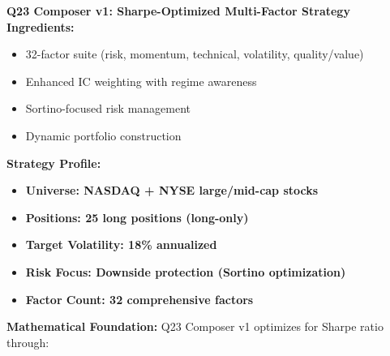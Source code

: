 \documentclass[11pt,letterpaper,openany]{book}
\begin{document}
\textbf{Q23 Composer v1: Sharpe-Optimized Multi-Factor Strategy}
\textbf{Ingredients:}
\begin{itemize}
    \item 32-factor suite (risk, momentum, technical, volatility, quality/value)
    \item Enhanced IC weighting with regime awareness
    \item Sortino-focused risk management
    \item Dynamic portfolio construction
\end{itemize}
\textbf{Strategy Profile:}
\begin{itemize}
    \item \textbf{Universe: NASDAQ + NYSE large/mid-cap stocks}
    \item \textbf{Positions: 25 long positions (long-only)}
    \item \textbf{Target Volatility: 18\% annualized}
    \item \textbf{Risk Focus: Downside protection (Sortino optimization)}
    \item \textbf{Factor Count: 32 comprehensive factors}
\end{itemize}
\textbf{Mathematical Foundation:}
Q23 Composer v1 optimizes for Sharpe ratio through:
\end{document}
